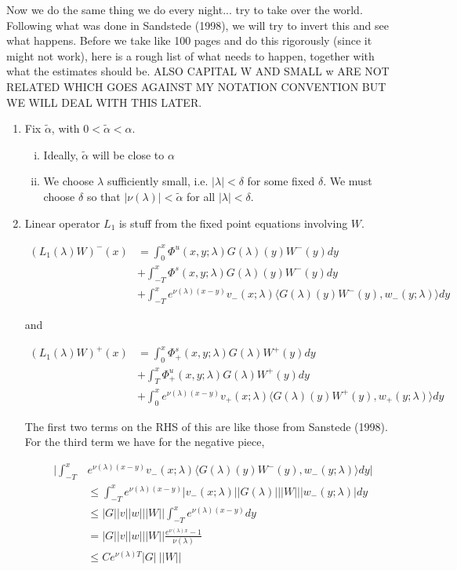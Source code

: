 \documentclass[12pt]{article}
\begin{document}
Now we do the same thing we do every night... try to take over the world. Following what was done in Sandstede (1998), we will try to invert this and see what happens. Before we take like 100 pages and do this rigorously (since it might not work), here is a rough list of what needs to happen, together with what the estimates should be. ALSO CAPITAL W AND SMALL w ARE NOT RELATED WHICH GOES AGAINST MY NOTATION CONVENTION BUT WE WILL DEAL WITH THIS LATER.

\begin{enumerate}

\item Fix $\tilde{\alpha}$, with $0 < \tilde{\alpha} < \alpha$. 

\begin{enumerate}[(i)]
	\item Ideally, $\tilde{\alpha}$ will be close to $\alpha$
	\item We choose $\lambda$ sufficiently small, i.e. $|\lambda| < \delta$ for some fixed $\delta$. We must choose $\delta$ so that $|\nu(\lambda)| < \tilde{\alpha}$ for all $|\lambda| < \delta$.
\end{enumerate}

\item Linear operator $L_1$ is stuff from the fixed point equations involving $W$.

\begin{align*}
(L_1(\lambda)W)^-(x) &= \int_0^x \Phi^u(x, y; \lambda) G(\lambda)(y)W^-(y) dy \\
&+ \int_{-T}^x \Phi^s(x, y; \lambda) G(\lambda)(y)W^-(y) dy \\
&+ \int_{-T}^x 
e^{\nu(\lambda)(x-y)} v_-(x; \lambda) \langle G(\lambda)(y)W^-(y), w_-(y; \lambda) \rangle dy 
\end{align*}

and

\begin{align*}
(L_1(\lambda)W)^+(x) &= \int_0^x \Phi^s_+(x, y; \lambda) G(\lambda)W^+(y) dy \\
&+ \int_T^x \Phi^u_+(x, y; \lambda) G(\lambda)W^+(y) dy \\
&+ \int_0^x e^{\nu(\lambda)(x-y)} v_+(x; \lambda) \langle G(\lambda)(y)W^+(y), w_+(y; \lambda) \rangle dy
\end{align*}

The first two terms on the RHS of this are like those from Sanstede (1998). For the third term we have for the negative piece,

\begin{align*}
\Big| \int_{-T}^x &e^{\nu(\lambda)(x-y)} v_-(x; \lambda) \langle G(\lambda)(y)W^-(y), w_-(y; \lambda) \rangle dy \Big| \\
&\leq \int_{-T}^x e^{\nu(\lambda)(x-y)} |v_-(x; \lambda)| |G(\lambda)|||W|||w_-(y; \lambda)|dy \\
&\leq |G||v||w|||W|| \int_{-T}^x e^{\nu(\lambda)(x-y)} dy \\
&= |G||v||w|||W|| \frac{e^{\nu(\lambda)x} - 1}{\nu(\lambda)} \\
&\leq C e^{\nu(\lambda)T} |G| \: ||W||
\end{align*}


\end{enumerate}
\end{document}
